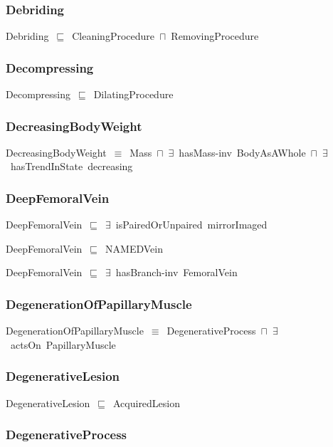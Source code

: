 \documentclass{article}
\begin{document}
\subsubsection*{Debriding}

Debriding~\ensuremath{\sqsubseteq}~CleaningProcedure~\ensuremath{\sqcap}~RemovingProcedure~

\subsubsection*{Decompressing}

Decompressing~\ensuremath{\sqsubseteq}~DilatingProcedure~

\subsubsection*{DecreasingBodyWeight}

DecreasingBodyWeight~\ensuremath{\equiv}~Mass~\ensuremath{\sqcap}~\ensuremath{\exists}~hasMass-inv~BodyAsAWhole~\ensuremath{\sqcap}~\ensuremath{\exists}~hasTrendInState~decreasing

\subsubsection*{DeepFemoralVein}

DeepFemoralVein~\ensuremath{\sqsubseteq}~\ensuremath{\exists}~isPairedOrUnpaired~mirrorImaged~

DeepFemoralVein~\ensuremath{\sqsubseteq}~NAMEDVein~

DeepFemoralVein~\ensuremath{\sqsubseteq}~\ensuremath{\exists}~hasBranch-inv~FemoralVein~

\subsubsection*{DegenerationOfPapillaryMuscle}

DegenerationOfPapillaryMuscle~\ensuremath{\equiv}~DegenerativeProcess~\ensuremath{\sqcap}~\ensuremath{\exists}~actsOn~PapillaryMuscle

\subsubsection*{DegenerativeLesion}

DegenerativeLesion~\ensuremath{\sqsubseteq}~AcquiredLesion~

\subsubsection*{DegenerativeProcess}
\end{document}
